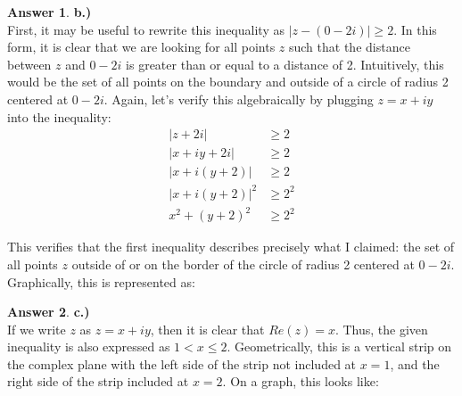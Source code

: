 \documentclass[10pt,a4paper]{article}
\theoremstyle{definition}
\newtheorem*{answer*}{Answer}
\begin{document}
\begin{answer*}{\textbf{b.)}}
\\First, it may be useful to rewrite this inequality as $|z - (0-2i)| \geq 2$. In this form, it is clear that we are looking for all points $z$ such that the distance between $z$ and $0 - 2i$ is greater than or equal to a distance of 2. Intuitively, this would be the set of all points on the boundary and outside of a circle of radius 2 centered at $0 - 2i$. Again, let's verify this algebraically by plugging $z = x+iy$ into the inequality:
\begin{align*}
|z + 2i| &\geq 2\\
|x + iy + 2i| &\geq 2\\
|x + i(y+2)| &\geq 2\\
|x + i(y+2)|^2 &\geq 2^2\\
x^2 + (y+2)^2 &\geq 2^2
\end{align*}

This verifies that the first inequality describes precisely what I claimed: the set of all points $z$ outside of or on the border of the circle of radius 2 centered at $0 - 2i$. Graphically, this is represented as:


\end{answer*}

\begin{answer*}{\textbf{c.)}}
\\If we write $z$ as $z = x + iy$, then it is clear that $Re(z) = x$. Thus, the given inequality is also expressed as $1 < x \leq 2$. Geometrically, this is a vertical strip on the complex plane with the left side of the strip not included at $x = 1$, and the right side of the strip included at $x = 2$. On a graph, this looks like:


\end{answer*}
\end{document}
